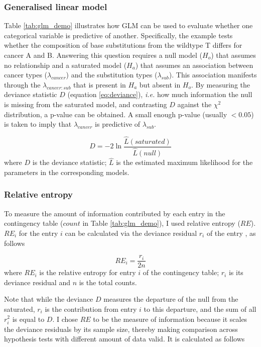 \subsubsection{Generalised linear model}
Table \ref{tab:glm_demo} illustrates how GLM can be used to evaluate whether one categorical variable is predictive of another. Specifically, the example tests whether the composition of base substitutions from the wildtype T differs for cancer A and B. Answering this question requires a null model ($H_o$) that assumes no relationship and a saturated model ($H_a$) that assumes an association between cancer types ($\lambda_{cancer}$) and the substitution types ($\lambda_{sub}$). This association manifests through the $\lambda_{cancer:sub}$ that is present in $H_a$ but absent in $H_o$. By measuring the deviance statistic $D$ (equation \ref{eq:deviance}), \textit{i.e.} how much information the null is missing from the saturated model, and contrasting $D$ against the $\chi^2$ distribution, a p-value can be obtained. A small enough p-value (usually $<0.05$) is taken to imply that $\lambda_{cancer}$ is predictive of $\lambda_{sub}$.

\begin{equation}
D = -2 \ln \frac{\hat{L}(saturated)}{\hat{L}(null)}
\label{eq:deviance}
\end{equation}
where $D$ is the deviance statistic; $\hat{L}$ is the estimated maximum likelihood for the parameters in the corresponding models.



\subsubsection{Relative entropy}\label{methods:re}
To measure the amount of information contributed by each entry in the contingency table ($count$ in Table \ref{tab:glm_demo}), I used relative entropy ($RE$). $RE_i$ for the entry $i$ can be calculated via the deviance residual $r_i$ of the entry \citep[$r_i$ obtained using appendix equation \ref{eq:dev_res};][]{Zhu2017}, as follows

\begin{equation}
    RE_i = \frac{r_i}{2n} 
    \label{eq:re}
\end{equation}
where $RE_i$ is the relative entropy for entry $i$ of the contingency table; $r_i$ is its deviance residual and $n$ is the total counts. 

Note that while the deviance $D$ measures the departure of the null from the saturated, $r_i$ is the contribution from entry $i$ to this departure, and the sum of all $r_i^2$ is equal to $D$. I chose $RE$ to be the measure of information because it scales the deviance residuals by its sample size, thereby making comparison across hypothesis tests with different amount of data valid. It is calculated as follows


